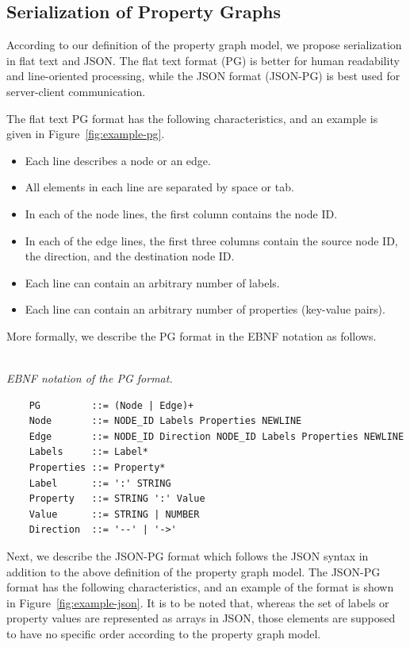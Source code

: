 \documentclass[runningheads]{llncs}
\begin{document}
\subsection{Serialization of Property Graphs}
According to our definition of the property graph model, we propose serialization in flat text and JSON. The flat text format (PG) is better for human readability and line-oriented processing, while the JSON format (JSON-PG) is best used for server-client communication.

The flat text PG format has the following characteristics, and an example is given in Figure~\ref{fig:example-pg}.

\begin{itemize}
    \item Each line describes a node or an edge.
    \item All elements in each line are separated by space or tab.
    \item In each of the node lines, the first column contains the node ID.
    \item In each of the edge lines, the first three columns contain the source node ID, the direction, and the destination node ID.
    \item Each line can contain an arbitrary number of labels.
    \item Each line can contain an arbitrary number of properties (key-value pairs).
\end{itemize}

More formally, we describe the PG format in the EBNF notation as follows.

\begin{defi}[PG Format]
\leavevmode \vspace{1mm} \\
\emph{EBNF notation of the PG format.}
\begin{scriptsize}
\begin{verbatim}
    PG         ::= (Node | Edge)+
    Node       ::= NODE_ID Labels Properties NEWLINE
    Edge       ::= NODE_ID Direction NODE_ID Labels Properties NEWLINE
    Labels     ::= Label*
    Properties ::= Property*
    Label      ::= ':' STRING
    Property   ::= STRING ':' Value
    Value      ::= STRING | NUMBER
    Direction  ::= '--' | '->'
\end{verbatim}
\end{scriptsize}
\end{defi}

Next, we describe the JSON-PG format which follows the JSON syntax in addition to the above definition of the property graph model. The JSON-PG format has the following characteristics, and an example of the format is shown in Figure~\ref{fig:example-json}. It is to be noted that, whereas the set of labels or property values are represented as arrays in JSON, those elements are supposed to have no specific order according to the property graph model.
\end{document}
